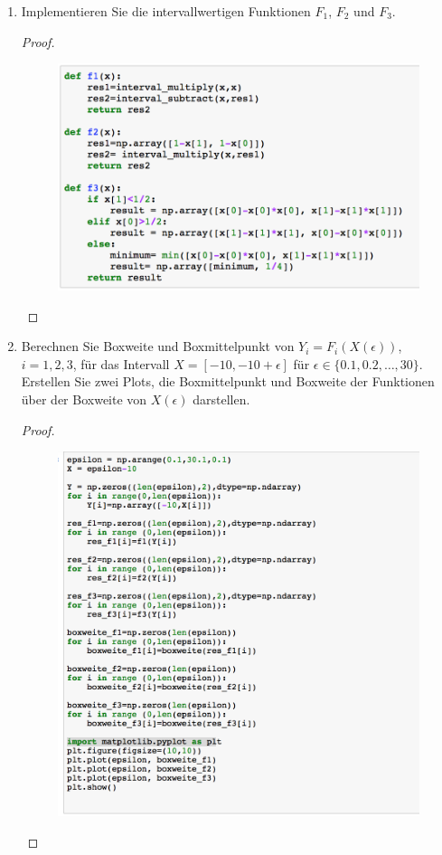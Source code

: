 \documentclass[12pt]{extreport} %
\theoremstyle{named}
\theoremstyle{nnamed}
\theoremstyle{itshape}
\theoremstyle{normal}
\begin{document}
\begin{enumerate}
\begin{proof}
\begin{itemize}
					\end{itemize}
		\end{proof}
	\item Implementieren Sie die intervallwertigen Funktionen $F_1$, $F_2$ und $F_3$.
		\begin{proof} ~\
			\begin{figure}[h!] \centering
				\includegraphics[scale=0.45]{img/su2iii-iii}
			\end{figure}
		\end{proof}   \newpage
	\item Berechnen Sie Boxweite und Boxmittelpunkt von $Y_i = F_i(X(\epsilon))$, $i = 1,2,3$, für das Intervall $X = [-10, -10 + \epsilon]$ für $\epsilon \in \{ 0.1, 0.2, \dotsc, 30\}$. Erstellen Sie zwei Plots, die Boxmittelpunkt und Boxweite der Funktionen über der Boxweite von $X(\epsilon)$ darstellen.
		\begin{proof} ~\
			\begin{figure}[h!] \centering
				\includegraphics[scale=0.45]{img/su2iii-iiii-11}

\end{figure}
\end{proof}
\end{enumerate}
\end{document}
